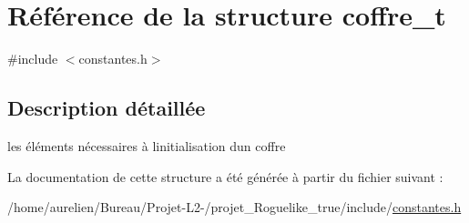 \hypertarget{structcoffre__t}{}\section{Référence de la structure coffre\+\_\+t}
\label{structcoffre__t}


{\ttfamily \#include $<$constantes.\+h$>$}



\subsection{Description détaillée}
les éléments nécessaires à l\textquotesingle{}initialisation d\textquotesingle{}un coffre 

La documentation de cette structure a été générée à partir du fichier suivant \+:\begin{DoxyCompactItemize}
\item 
/home/aurelien/\+Bureau/\+Projet-\/\+L2-\//projet\+\_\+\+Roguelike\+\_\+true/include/\hyperlink{constantes_8h}{constantes.\+h}\end{DoxyCompactItemize}
